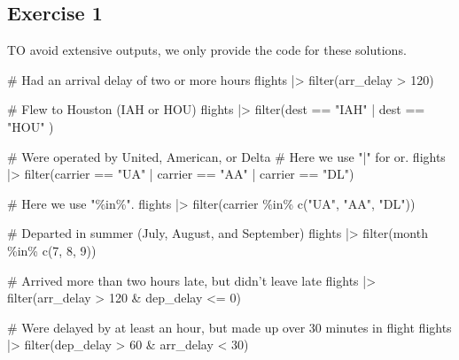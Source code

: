 \documentclass[
  letterpaper,
  DIV=11,
  numbers=noendperiod]{scrreprt}
\newenvironment{Shaded}{\begin{snugshade}}{\end{snugshade}}
\newcommand{\CommentTok}[1]{\textcolor[rgb]{0.37,0.37,0.37}{#1}}
\newcommand{\DecValTok}[1]{\textcolor[rgb]{0.68,0.00,0.00}{#1}}
\newcommand{\FunctionTok}[1]{\textcolor[rgb]{0.28,0.35,0.67}{#1}}
\newcommand{\NormalTok}[1]{\textcolor[rgb]{0.00,0.23,0.31}{#1}}
\newcommand{\SpecialCharTok}[1]{\textcolor[rgb]{0.37,0.37,0.37}{#1}}
\newcommand{\StringTok}[1]{\textcolor[rgb]{0.13,0.47,0.30}{#1}}
\begin{document}
\subsection{Exercise 1}\label{exercise-1-10}

TO avoid extensive outputs, we only provide the code for these
solutions.

\begin{Shaded}
\begin{Highlighting}[]
\CommentTok{\# Had an arrival delay of two or more hours}
\NormalTok{flights }\SpecialCharTok{|\textgreater{}}
  \FunctionTok{filter}\NormalTok{(arr\_delay }\SpecialCharTok{\textgreater{}} \DecValTok{120}\NormalTok{)}

\CommentTok{\# Flew to Houston (IAH or HOU)}
\NormalTok{flights }\SpecialCharTok{|\textgreater{}}
  \FunctionTok{filter}\NormalTok{(dest }\SpecialCharTok{==} \StringTok{"IAH"} \SpecialCharTok{|}\NormalTok{ dest }\SpecialCharTok{==} \StringTok{"HOU"}\NormalTok{ )}

\CommentTok{\# Were operated by United, American, or Delta}
\CommentTok{\# Here we use "|" for or.}
\NormalTok{flights }\SpecialCharTok{|\textgreater{}}
  \FunctionTok{filter}\NormalTok{(carrier }\SpecialCharTok{==} \StringTok{"UA"} \SpecialCharTok{|}\NormalTok{ carrier }\SpecialCharTok{==} \StringTok{"AA"} \SpecialCharTok{|}\NormalTok{ carrier }\SpecialCharTok{==} \StringTok{"DL"}\NormalTok{)}

\CommentTok{\# Here we use "\%in\%".}
\NormalTok{flights }\SpecialCharTok{|\textgreater{}}
  \FunctionTok{filter}\NormalTok{(carrier }\SpecialCharTok{\%in\%} \FunctionTok{c}\NormalTok{(}\StringTok{"UA"}\NormalTok{, }\StringTok{"AA"}\NormalTok{, }\StringTok{"DL"}\NormalTok{))}

\CommentTok{\# Departed in summer (July, August, and September)}
\NormalTok{flights }\SpecialCharTok{|\textgreater{}}
  \FunctionTok{filter}\NormalTok{(month }\SpecialCharTok{\%in\%} \FunctionTok{c}\NormalTok{(}\DecValTok{7}\NormalTok{, }\DecValTok{8}\NormalTok{, }\DecValTok{9}\NormalTok{)) }

\CommentTok{\# Arrived more than two hours late, but didn’t leave late}
\NormalTok{flights }\SpecialCharTok{|\textgreater{}}
  \FunctionTok{filter}\NormalTok{(arr\_delay }\SpecialCharTok{\textgreater{}} \DecValTok{120} \SpecialCharTok{\&}\NormalTok{ dep\_delay }\SpecialCharTok{\textless{}=} \DecValTok{0}\NormalTok{) }

\CommentTok{\# Were delayed by at least an hour, but made up over 30 minutes in flight}
\NormalTok{flights }\SpecialCharTok{|\textgreater{}}
  \FunctionTok{filter}\NormalTok{(dep\_delay }\SpecialCharTok{\textgreater{}} \DecValTok{60} \SpecialCharTok{\&}\NormalTok{ arr\_delay }\SpecialCharTok{\textless{}} \DecValTok{30}\NormalTok{) }
\end{Highlighting}
\end{Shaded}
\end{document}
